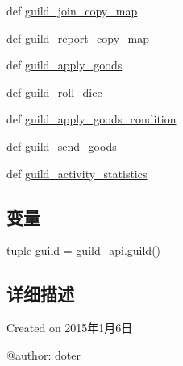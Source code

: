 \begin{DoxyCompactItemize}
def \hyperlink{namespaceapi_1_1guild_aacfa93d3fbf5ab3b0ef044515292c53a}{guild\-\_\-join\-\_\-copy\-\_\-map}
\item 
def \hyperlink{namespaceapi_1_1guild_a2b569eb4873c098268bc9b623dacfe4c}{guild\-\_\-report\-\_\-copy\-\_\-map}
\item 
def \hyperlink{namespaceapi_1_1guild_a13d031fcad322dfa651ad3c9abc513dd}{guild\-\_\-apply\-\_\-goods}
\item 
def \hyperlink{namespaceapi_1_1guild_a99d1d53f1cee2d03abf2f9ddc0602734}{guild\-\_\-roll\-\_\-dice}
\item 
def \hyperlink{namespaceapi_1_1guild_a746c298fb578a479e69c9afaa0f6c67e}{guild\-\_\-apply\-\_\-goods\-\_\-condition}
\item 
def \hyperlink{namespaceapi_1_1guild_a9dcddeae1c2123bc3abffcbf6402cb61}{guild\-\_\-send\-\_\-goods}
\item 
def \hyperlink{namespaceapi_1_1guild_a24d5abcf3f3a8b10433f63e9573f89b8}{guild\-\_\-activity\-\_\-statistics}
\end{DoxyCompactItemize}
\subsection*{变量}
\begin{DoxyCompactItemize}
\item 
tuple \hyperlink{namespaceapi_1_1guild_ad1df65db91f8b645037c32ca1e465c40}{guild} = guild\-\_\-api.\-guild()
\end{DoxyCompactItemize}


\subsection{详细描述}
\begin{DoxyVerb}Created on 2015年1月6日

@author: doter
\end{DoxyVerb}
 

